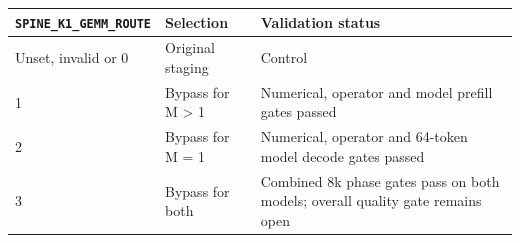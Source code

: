 \documentclass[10pt,a4paper]{article}
\begin{document}
\begin{longtable}[]{@{}lll@{}}
\toprule
\begin{minipage}[b]{0.30\columnwidth}\raggedright
\nolinkurl{SPINE_K1_GEMM_ROUTE}\strut
\end{minipage} & \begin{minipage}[b]{0.30\columnwidth}\raggedright
Selection\strut
\end{minipage} & \begin{minipage}[b]{0.30\columnwidth}\raggedright
Validation status\strut
\end{minipage}\tabularnewline
\midrule
\endhead
\begin{minipage}[t]{0.30\columnwidth}\raggedright
Unset, invalid or 0\strut
\end{minipage} & \begin{minipage}[t]{0.30\columnwidth}\raggedright
Original staging\strut
\end{minipage} & \begin{minipage}[t]{0.30\columnwidth}\raggedright
Control\strut
\end{minipage}\tabularnewline
\begin{minipage}[t]{0.30\columnwidth}\raggedright
1\strut
\end{minipage} & \begin{minipage}[t]{0.30\columnwidth}\raggedright
Bypass for M \textgreater{} 1\strut
\end{minipage} & \begin{minipage}[t]{0.30\columnwidth}\raggedright
Numerical, operator and model prefill gates passed\strut
\end{minipage}\tabularnewline
\begin{minipage}[t]{0.30\columnwidth}\raggedright
2\strut
\end{minipage} & \begin{minipage}[t]{0.30\columnwidth}\raggedright
Bypass for M = 1\strut
\end{minipage} & \begin{minipage}[t]{0.30\columnwidth}\raggedright
Numerical, operator and 64-token model decode gates passed\strut
\end{minipage}\tabularnewline
\begin{minipage}[t]{0.30\columnwidth}\raggedright
3\strut
\end{minipage} & \begin{minipage}[t]{0.30\columnwidth}\raggedright
Bypass for both\strut
\end{minipage} & \begin{minipage}[t]{0.30\columnwidth}\raggedright
Combined 8k phase gates pass on both models; overall quality gate
remains open\strut
\end{minipage}\tabularnewline
\bottomrule
\end{longtable}
\end{document}
